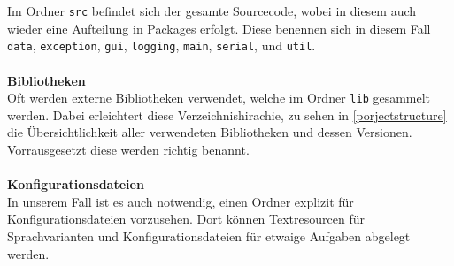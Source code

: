 Im Ordner \lstinline{src} befindet sich der gesamte Sourcecode, wobei in diesem auch wieder eine Aufteilung in Packages erfolgt.
Diese benennen sich in diesem Fall \lstinline{data}, \lstinline{exception}, \lstinline{gui}, \lstinline{logging}, \lstinline{main}, \lstinline{serial}, und \lstinline{util}.
\\\\
\textbf{Bibliotheken}
\\
Oft werden externe Bibliotheken verwendet, welche im Ordner \lstinline{lib} gesammelt werden.
Dabei erleichtert diese Verzeichnishirachie, zu sehen in \autoref{porjectstructure} die Übersichtlichkeit aller verwendeten Bibliotheken und dessen Versionen.
Vorrausgesetzt diese werden richtig benannt.
\\\\
\textbf{Konfigurationsdateien}
\\
In unserem Fall ist es auch notwendig, einen Ordner explizit für Konfigurationsdateien vorzusehen.
Dort können Textresourcen für Sprachvarianten und Konfigurationsdateien für etwaige Aufgaben abgelegt werden.

